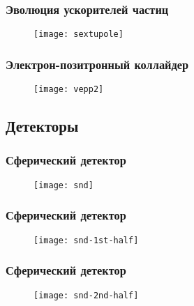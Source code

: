 \begin{frame}
    \frametitle{Эволюция ускорителей частиц}
    \begin{figure}
        \begin{centering}
            \texttt{[image: sextupole]}
        \end{centering}
    \end{figure}
\end{frame}

\begin{frame}
    \frametitle{Электрон-позитронный коллайдер}
    \begin{figure}
        \begin{centering}
            \texttt{[image: vepp2]}
        \end{centering}
    \end{figure}
\end{frame}

\subsection{Детекторы}
\begin{frame}
    \frametitle{Сферический детектор}
    \begin{figure}
        \begin{centering}
            \texttt{[image: snd]}
        \end{centering}
    \end{figure}
\end{frame}
\begin{frame}
    \frametitle{Сферический детектор}
    \begin{figure}
        \begin{centering}
            \texttt{[image: snd-1st-half]}
        \end{centering}
    \end{figure}
\end{frame}
\begin{frame}
    \frametitle{Сферический детектор}
    \begin{figure}
        \begin{centering}
            \texttt{[image: snd-2nd-half]}
        \end{centering}
    \end{figure}
\end{frame}

